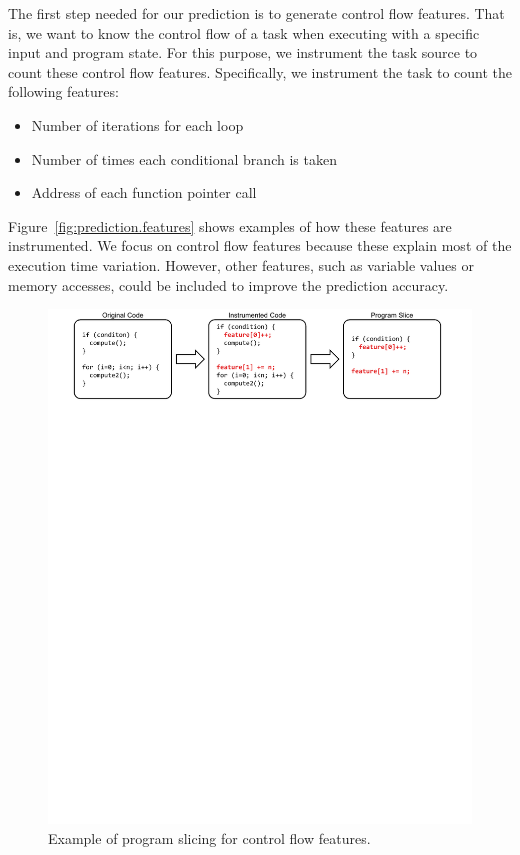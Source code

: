 The first step needed for our prediction is to generate control flow features.
That is, we want to know the control flow of a task when executing with a
specific input and program state.
For this purpose, we instrument the task source to count these control flow features.
Specifically, we instrument the task to count the following features:
\begin{itemize}
  \item Number of iterations for each loop
  \item Number of times each conditional branch is taken
  \item Address of each function pointer call
\end{itemize}
Figure~\ref{fig:prediction.features} shows examples of how these features are
instrumented. 
We focus on control flow features because these explain 
most of the execution time variation. However, other features, such as variable
values or memory accesses, could be included to improve the prediction
accuracy.

\begin{figure}
  \begin{center}
    \includegraphics{exec_time_prediction/figs/code_transformations.pdf}
    \caption{Example of program slicing for control flow features.}
    \label{fig:prediction.code_transformations}
  \end{center}
\end{figure}

